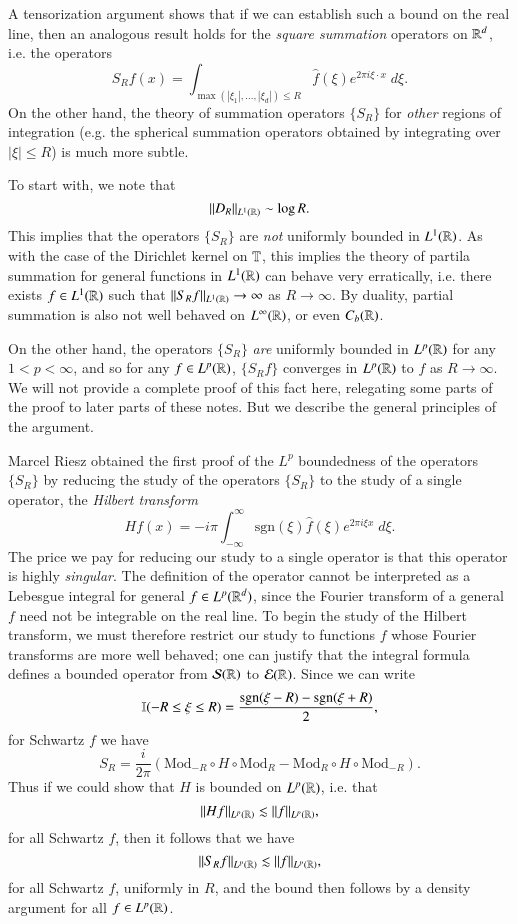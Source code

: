 A tensorization argument shows that if we can establish such a bound on the real line, then an analogous result holds for the \emph{square summation} operators on $\operatorname{\mathbb{R}}^d$, i.e. the operators
%
\[ S_R f(x) = \int_{\max(|\xi_1|, \dots, |\xi_d|) \leq R} \widehat{f}(\xi) e^{2 \pi i \xi \cdot x}\; d\xi. \]
%
On the other hand, the theory of summation operators $\{ S_R \}$ for \emph{other} regions of integration (e.g. the spherical summation operators obtained by integrating over $|\xi| \leq R$) is much more subtle.

To start with, we note that
%
\[ \| D_R \|_{L^1(\operatorname{\mathbb{R}})} \sim \log R. \]
%
This implies that the operators $\{ S_R \}$ are \emph{not} uniformly bounded in $L^1(\operatorname{\mathbb{R}})$. As with the case of the Dirichlet kernel on $\operatorname{\mathbb{T}}$, this implies the theory of partila summation for general functions in $L^1(\operatorname{\mathbb{R}})$ can behave very erratically, i.e. there exists $f \in L^1(\operatorname{\mathbb{R}})$ such that $\| S_R f \|_{L^1(\operatorname{\mathbb{R}})} \to \infty$ as $R \to \infty$. By duality, partial summation is also not well behaved on $L^\infty(\operatorname{\mathbb{R}})$, or even $C_b(\operatorname{\mathbb{R}})$.

On the other hand, the operators $\{ S_R \}$ \emph{are} uniformly bounded in $L^p(\operatorname{\mathbb{R}})$ for any $1 < p < \infty$, and so for any $f \in L^p(\operatorname{\mathbb{R}})$, $\{ S_R f \}$ converges in $L^p(\operatorname{\mathbb{R}})$ to $f$ as $R \to \infty$. We will not provide a complete proof of this fact here, relegating some parts of the proof to later parts of these notes. But we describe the general principles of the argument.

Marcel Riesz obtained the first proof of the $L^p$ boundedness of the operators $\{ S_R \}$ by reducing the study of the operators $\{ S_R \}$ to the study of a single operator, the \emph{Hilbert transform}
%
\[ Hf(x) = - i \pi \int_{-\infty}^\infty \text{sgn}(\xi) \widehat{f}(\xi) e^{2 \pi i \xi x}\; d\xi. \]
%
The price we pay for reducing our study to a single operator is that this operator is highly \emph{singular}. The definition of the operator cannot be interpreted as a Lebesgue integral for general $f \in L^p(\operatorname{\mathbb{R}}^d)$, since the Fourier transform of a general $f$ need not be integrable on the real line. To begin the study of the Hilbert transform, we must therefore restrict our study to functions $f$ whose Fourier transforms are more well behaved; one can justify that the integral formula defines a bounded operator from $\operatorname{\mathcal{S}}(\operatorname{\mathbb{R}})$ to $\operatorname{\mathcal{E}}(\operatorname{\mathbb{R}})$. Since we can write
%
\[ \operatorname{\mathbb{I}}(-R \leq \xi \leq R) = \frac{\text{sgn}(\xi - R) - \text{sgn}(\xi + R)}{2}, \]
%
for Schwartz $f$ we have
%
\[ S_R = \frac{i}{2 \pi} \left( \text{Mod}_{-R} \circ H \circ \text{Mod}_R - \text{Mod}_R \circ H \circ \text{Mod}_{-R} \right). \]
%
Thus if we could show that $H$ is bounded on $L^p(\operatorname{\mathbb{R}})$, i.e. that
%
\[ \| Hf \|_{L^p(\operatorname{\mathbb{R}})} \lesssim \| f \|_{L^p(\operatorname{\mathbb{R}})}, \]
%
for all Schwartz $f$, then it follows that we have
%
\[ \| S_R f \|_{L^p(\operatorname{\mathbb{R}})} \lesssim \| f \|_{L^p(\operatorname{\mathbb{R}})}, \]
%
for all Schwartz $f$, uniformly in $R$, and the bound then follows by a density argument for all $f \in L^p(\operatorname{\mathbb{R}})$.

